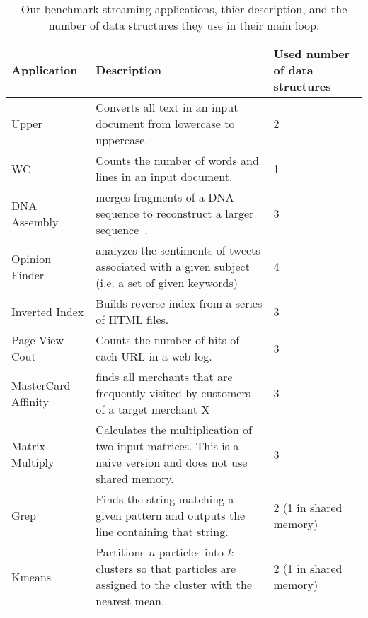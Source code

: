 \begin{table*}[ht]
{
\begin{center}
\resizebox{17cm}{2.1cm}
{
  \begin{tabular}{|p{2.8cm}|p{14.4cm}|p{3.5cm}|} \hline
         {\bf Application} & {\bf Description} &  {\bf Used number of data structures}\\
\hline
	  {Upper} &   {Converts all text in an input document from lowercase to uppercase.} &  {2}\\  \hline
	  {WC} &   {Counts the number of words and lines in an input document.} &  {1}\\ \hline
	  {DNA Assembly} & {merges fragments of a DNA sequence to reconstruct a larger sequence~\cite{dnaassembly}.} & {3}\\ \hline
	  {Opinion Finder} & {analyzes the sentiments of tweets associated with a given subject (i.e. a set of given keywords)~\cite{wilson2005opinionfinder}} &  {4}\\ \hline
	  {Inverted Index} & {Builds reverse index from a series of HTML files.} & {3}\\ \hline
	  {Page View Cout} & {Counts the number of hits of each URL in a web log.} & {3}\\ \hline
          {MasterCard Affinity} & {finds all merchants that are frequently visited by customers of a target merchant X~\cite{}} & {3}\\ \hline
	  {Matrix Multiply} & {Calculates the multiplication of two input matrices. This is a naive version and does not use shared memory.} & {3}\\ \hline
	  {Grep} & {Finds the string matching a given pattern and outputs the line containing that string.} & {2 (1 in shared memory)}\\ \hline
	  {Kmeans} & {Partitions $n$ particles into $k$ clusters so that particles are assigned to the cluster with the nearest mean.} & {2 (1 in shared memory)}\\ \hline
  \end{tabular}
}
\end{center}
}
\vspace{-0.0cm}
\caption{Our benchmark streaming applications, thier description, and the number of data structures they use in their main loop.} %
\label{tab:apps}
\vspace{-0.0cm}
\end{table*}





